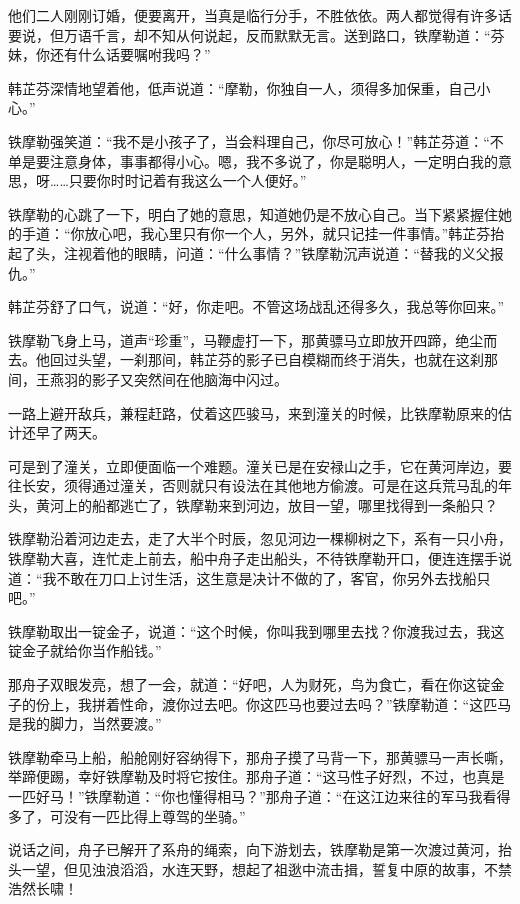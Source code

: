 \documentclass[12pt,oneside]{book}
\begin{document}
他们二人刚刚订婚，便要离开，当真是临行分手，不胜依依。两人都觉得有许多话要说，但万语千言，却不知从何说起，反而默默无言。送到路口，铁摩勒道：``芬妹，你还有什么话要嘱咐我吗？''

韩芷芬深情地望着他，低声说道：``摩勒，你独自一人，须得多加保重，自己小心。''

铁摩勒强笑道：``我不是小孩子了，当会料理自己，你尽可放心！''韩芷芬道：``不单是要注意身体，事事都得小心。嗯，我不多说了，你是聪明人，一定明白我的意思，呀\ldots\ldots 只要你时时记着有我这么一个人便好。''

铁摩勒的心跳了一下，明白了她的意思，知道她仍是不放心自己。当下紧紧握住她的手道：``你放心吧，我心里只有你一个人，另外，就只记挂一件事情。''韩芷芬抬起了头，注视着他的眼睛，问道：``什么事情？''铁摩勒沉声说道：``替我的义父报仇。''

韩芷芬舒了口气，说道：``好，你走吧。不管这场战乱还得多久，我总等你回来。''

铁摩勒飞身上马，道声``珍重''，马鞭虚打一下，那黄骠马立即放开四蹄，绝尘而去。他回过头望，一刹那间，韩芷芬的影子已自模糊而终于消失，也就在这刹那间，王燕羽的影子又突然间在他脑海中闪过。

一路上避开敌兵，兼程赶路，仗着这匹骏马，来到潼关的时候，比铁摩勒原来的估计还早了两天。

可是到了潼关，立即便面临一个难题。潼关已是在安禄山之手，它在黄河岸边，要往长安，须得通过潼关，否则就只有设法在其他地方偷渡。可是在这兵荒马乱的年头，黄河上的船都逃亡了，铁摩勒来到河边，放目一望，哪里找得到一条船只？

铁摩勒沿着河边走去，走了大半个时辰，忽见河边一棵柳树之下，系有一只小舟，铁摩勒大喜，连忙走上前去，船中舟子走出船头，不待铁摩勒开口，便连连摆手说道：``我不敢在刀口上讨生活，这生意是决计不做的了，客官，你另外去找船只吧。''

铁摩勒取出一锭金子，说道：``这个时候，你叫我到哪里去找？你渡我过去，我这锭金子就给你当作船钱。''

那舟子双眼发亮，想了一会，就道：``好吧，人为财死，鸟为食亡，看在你这锭金子的份上，我拼着性命，渡你过去吧。你这匹马也要过去吗？''铁摩勒道：``这匹马是我的脚力，当然要渡。''

铁摩勒牵马上船，船舱刚好容纳得下，那舟子摸了马背一下，那黄骠马一声长嘶，举蹄便踢，幸好铁摩勒及时将它按住。那舟子道：``这马性子好烈，不过，也真是一匹好马！''铁摩勒道：``你也懂得相马？''那舟子道：``在这江边来往的军马我看得多了，可没有一匹比得上尊驾的坐骑。''

说话之间，舟子已解开了系舟的绳索，向下游划去，铁摩勒是第一次渡过黄河，抬头一望，但见浊浪滔滔，水连天野，想起了祖逖中流击揖，誓复中原的故事，不禁浩然长啸！
\end{document}
